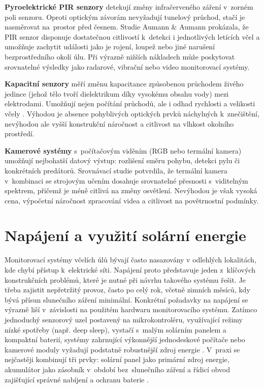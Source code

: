 \textbf{Pyroelektrické PIR senzory} detekují změny infračerveného záření v~zorném poli senzoru. Oproti optickým závorám nevyžadují tunelový průchod, stačí je nasměrovat na~prostor před česnem. Studie Aumann \& Aumann \cite{Aumann2023} prokázala, že PIR senzor disponuje dostatečnou citlivostí k~detekci i jednotlivých letících včel a umožňuje zachytit události jako je rojení, loupež nebo jiné narušení bezprostředního okolí úlu. Při výrazně nižších nákladech může poskytovat srovnatelné výsledky jako radarové, vibrační nebo video monitorovací systémy.

\textbf{Kapacitní senzory} měří změnu kapacitance způsobenou průchodem živého jedince (jehož tělo tvoří dielektrikum díky vysokému obsahu vody) mezi elektrodami. Umožňují nejen počítání průchodů, ale i odhad rychlosti a velikosti včely \cite{Campbell2005}. Výhodou je absence pohyblivých optických prvků náchylných k~znečištění, nevýhodou ale vyšší konstrukční náročnost a citlivost na vlhkost okolního prostředí.

\textbf{Kamerové systémy} s~počítačovým viděním (RGB nebo termální kamera) umožňují nejbohatší datový výstup: rozlišení směru pohybu, detekci pylu či konkrétních predátorů. Srovnávací studie \cite{Williams2022} potvrdila, že termální kamera v~kombinaci se strojovým učením dosahuje srovnatelné přesnosti s~viditelným spektrem, přičemž je méně citlivá na změny osvětlení. Nevýhodou je však vysoká cena, výpočetní náročnost zpracování videa a citlivost na povětrnostní podmínky.

\section{Napájení a využití solární energie}
Monitorovací systémy včelích úlů bývají často nasazovány v odlehlých lokalitách, kde chybí přístup k~elektrické síti. Napájení proto představuje jeden z~klíčových konstrukčních problémů, které je nutné při návrhu takového systému řešit. Je třeba zajistit nepřetržitý provoz, často po celý rok, včetně zimních měsíců, kdy bývá přísun slunečního záření minimální. Konkrétní požadavky na napájení se výrazně liší v~závislosti na použitém hardwaru monitorovacího systému. Zatímco jednoduchý senzorový uzel postavený na mikrokontroléru, využívající režimy nízké spotřeby (např. deep sleep), vystačí s~malým solárním panelem a kompaktní baterií, systémy zahrnující výkonnější jednodeskové počítače nebo kamerové moduly vyžadují podstatně robustnější zdroj energie \cite{Spaner2025}. V~praxi se nejčastěji kombinují tři prvky: solární panel jako primární zdroj energie, akumulátor jako zásobník v~období bez~slunečního záření a řídicí obvod zajišťující správné nabíjení a ochranu baterie \cite{honestbee}.

